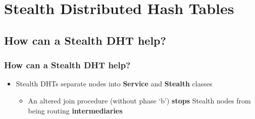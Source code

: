 \documentclass{beamer}
\begin{document}
\section{Stealth Distributed Hash Tables}
\subsection{How can a Stealth DHT help?}
\begin{frame}
  \frametitle{How can a Stealth DHT help?}
  \begin{itemize}
  \item{Stealth DHTs separate nodes into \textbf{Service} and \textbf{Stealth} classes}
    \begin{itemize}
    \item{An altered join procedure (without phase `b') \textbf{stops} Stealth nodes from being routing \textbf{intermediaries}}
    \end{itemize}
  \end{itemize}

  \begin{center}
  \end{center}
\end{frame}
\end{document}
